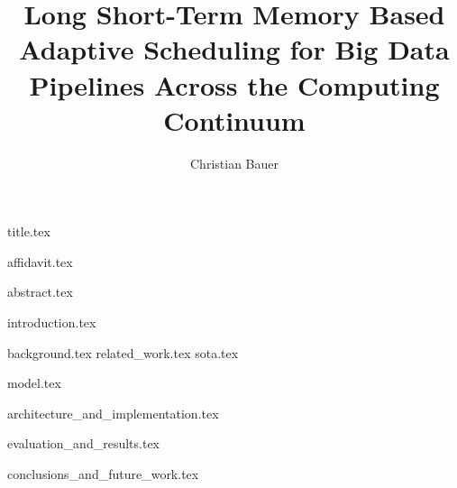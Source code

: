 \documentclass[
a4paper, %
11pt, %
onecolumn, %
openany, %
]{memoir}
\title{Long Short-Term Memory Based Adaptive Scheduling for Big Data Pipelines Across the Computing Continuum}
\author{Christian Bauer}
\begin{document}
  {title.tex}


  \tableofcontents
  \listoffigures
  \listoftables
  \lstlistoflistings

  \pagebreak
  {affidavit.tex}

  \pagebreak
  {abstract.tex}
  
  {introduction.tex}

  {background.tex}
  {related_work.tex}
  {sota.tex}

  {model.tex}

  {architecture_and_implementation.tex}
  
  {evaluation_and_results.tex}

  {conclusions_and_future_work.tex}


  
  
\end{document}
